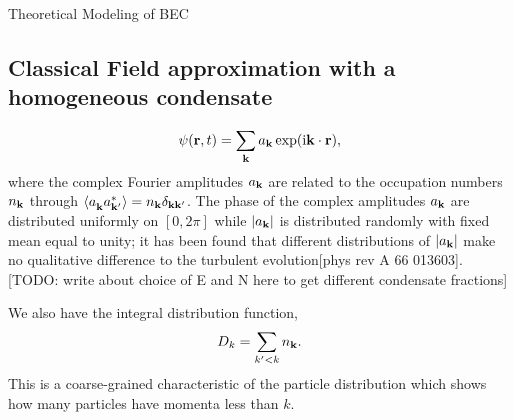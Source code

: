 \begin{chapter}{\label{cha:theoretical_model}Theoretical Modeling of BEC}
	\subsection{\label{section:cfield} Classical Field approximation with a homogeneous condensate}
		\begin{equation}
		\psi({\bf r},t) = \sum_{\bf k} a_{\bf k} \exp (\mathrm{i}{\bf k}\cdot{\bf r}),
		\label{eq:cFieldIC}
		\end{equation}
		where the complex Fourier amplitudes $a_{\bf k}$ are related to the occupation numbers $n_{\bf k}$ through $\braket{a_{\bf k}^{\,}a_{\bf k'}^*} = n_{\bf k}\delta_{\bf kk'}$. The phase of the complex amplitudes $a_{\bf k}$ are distributed uniformly on $[0,2\pi]$ while $|a_{\bf k}|$ is distributed randomly with fixed mean equal to unity; it has been found that different distributions of $|a_{\bf k}|$ make no qualitative difference to the turbulent evolution[phys rev A 66 013603]. [TODO: write about choice of E and N here to get different condensate fractions]

		We also have the integral distribution function,
		\begin{equation}
		D_k = \sum_{k'<k}n_{\bf k}.
		\label{eq:intDistFunc}
		\end{equation}
		This is a coarse-grained characteristic of the particle distribution which shows how many particles have momenta less than $k$.
\end{chapter}
